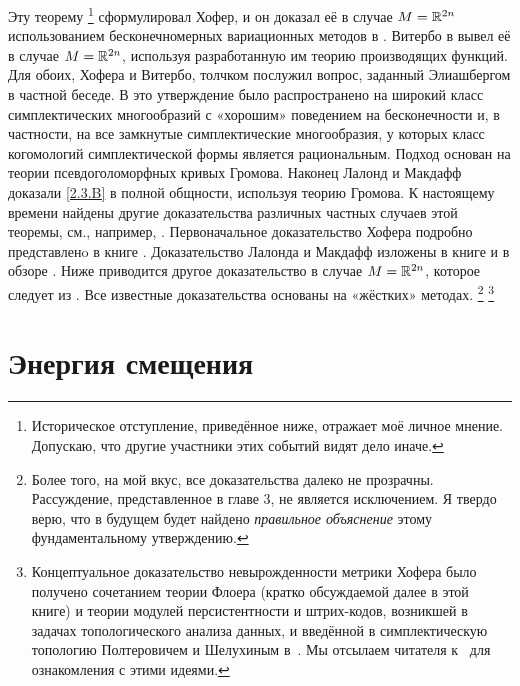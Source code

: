 Эту теорему%
\footnote{Историческое отступление, приведённое ниже, отражает моё личное мнение.
Допускаю, что другие участники этих событий видят дело иначе.}
сформулировал Хофер, и он доказал её в случае $M = \mathbb{R}^{2n}$
использованием бесконечномерных вариационных методов в \cite{H1}.
Витербо в \cite{V1} вывел её в случае $M = \mathbb{R}^{2n}$,
используя разработанную им теорию производящих функций.
Для обоих, Хофера и Витербо, толчком послужил вопрос, заданный
Элиашбергом в частной беседе.
В \cite{P1} это утверждение было распространено на широкий класс
симплектических многообразий с «хорошим» поведением на бесконечности
и, в частности, на все замкнутые симплектические многообразия, у
которых класс когомологий симплектической формы является
рациональным.
Подход \cite{P1} основан на теории псевдоголоморфных кривых Громова.
Наконец \cite{LM1} Лалонд и Макдафф доказали \ref{2.3.B} в полной
общности, используя теорию Громова. 
К настоящему времени найдены другие доказательства различных частных случаев этой теоремы, см., например, \cite{Ch,O3,Sch3}.
Первоначальное доказательство Хофера подробно представленo в книге
\cite{HZ}.
Доказательство Лалонда и Макдафф изложены в книге \cite{MS} и в обзоре \cite{L}.
Ниже приводится другое доказательство в случае $M = \mathbb{R}^{2n}$, которое следует из \cite{P1}.
Все известные доказательства основаны на «жёстких» методах.%
\footnote{Более того, на мой вкус, все доказательства далеко не
  прозрачны.
  Рассуждение, представленное в главе 3, не является исключением.
  Я твердо верю, что в будущем будет найдено {}\emph{правильное
    объяснение} этому фундаментальному утверждению.}%
\footnote{  %
  Концептуальное доказательство невырожденности метрики Хофера
  было получено сочетанием теории Флоера (кратко обсуждаемой далее в
  этой книге) и теории модулей персистентности и штрих-кодов, возникшей в
  задачах топологического анализа данных, и введённой в симплектическую
  топологию Полтеровичем и Шелухиным в~\cite{PS16}. Мы отсылаем
  читателя к~\cite{PS16,UZ,PRSZ} для ознакомления с этими
  идеями.\dpp}

\section{Энергия смещения}\label{sec:2.4}

